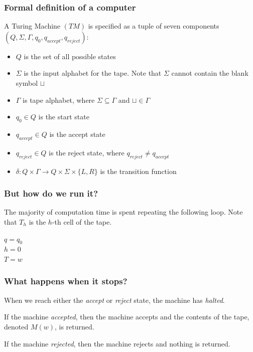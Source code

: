 \documentclass[aspectratio=169]{beamer}
\begin{document}
\begin{frame}
\frametitle{Formal definition of a computer}
A Turing Machine $(TM)$ is specified as a tuple of seven components $(Q, \Sigma, \Gamma, q_0, q_{accept}, q_{reject})$:

\begin{itemize}
    \item $Q$ is the set of all possible states
    \item $\Sigma$ is the input alphabet for the tape. Note that $\Sigma$ cannot contain the blank symbol $\sqcup$
    \item $\Gamma$ is tape alphabet, where $\Sigma \subseteq \Gamma$ and $\sqcup \in \Gamma$
    \item $q_0 \in Q$ is the start state
    \item $q_{accept} \in Q$ is the accept state
    \item $q_{reject} \in Q$ is the reject state, where $q_{reject} \neq q_{accept}$
    \item $\delta: Q \times \Gamma \to Q \times \Sigma \times \{L, R\}$ is the transition function
\end{itemize}
\end{frame}

\begin{frame}
\frametitle{But how do we run it?}
The majority of computation time is spent repeating the following loop. Note that $T_h$ is the $h$-th cell of the tape.
\begin{algorithm}[H]
$q = q_0$\\
$h = 0$\\
$T = w$ 
\end{algorithm}
\end{frame}

\begin{frame}
\frametitle{What happens when it stops?}
When we reach either the {\em accept} or {\em reject} state, the machine has {\em halted}.

If the machine {\em accepted}, then the machine accepts and the contents of the tape, denoted $M(w)$, is returned.

If the machine {\em rejected}, then the machine rejects and nothing is returned.
\end{frame}
\end{document}
